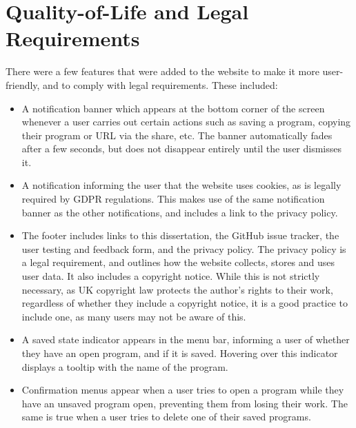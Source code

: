 \documentclass[../main.tex]{subfiles}
\begin{document}
    \section{Quality-of-Life and Legal Requirements}
        There were a few features that were added to the website to make it more
            user-friendly, and to comply with legal requirements.
        These included:
        \begin{itemize}
            \item A notification banner which appears at the bottom corner of the screen
                  whenever a user carries out certain actions such as saving a program, copying
                  their program or URL via the share, etc.
                  The banner automatically fades after a few seconds, but does not disappear
                      entirely until the user dismisses it.
            \item A notification informing the user that the website uses cookies, as is legally
                  required by GDPR regulations.
                  This makes use of the same notification banner as the other notifications, and
                      includes a link to the privacy policy.
            \item The footer includes links to this dissertation, the GitHub issue tracker,
                  the user testing and feedback form, and the privacy policy.
                  The privacy policy is a legal requirement, and outlines how the website
                      collects, stores and uses user data.
                  It also includes a copyright notice.
                  While this is not strictly necessary, as UK copyright law protects the author's
                      rights to their work, regardless of whether they include a copyright notice, it
                      is a good practice to include one, as many users may not be aware of this.
            \item A saved state indicator appears in the menu bar, informing a user of whether
                  they have an open program, and if it is saved.
                  Hovering over this indicator displays a tooltip with the name of the program.
            \item Confirmation menus appear when a user tries to open a program while they
                  have an unsaved program open, preventing them from losing their work.
                  The same is true when a user tries to delete one of their saved programs.
        \end{itemize}
\end{document}
